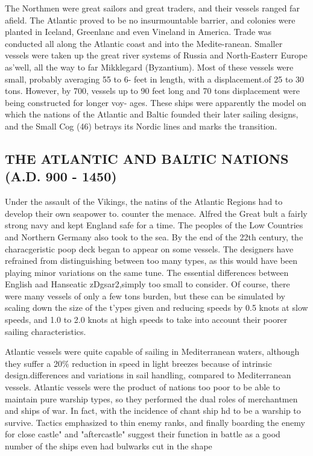 \documentclass{article}
\begin{document}
\begin{multicols}{2}
The Northmen were great sailors and great traders, and their vessels
ranged far afield.  The Atlantic proved to be no insurmountable
barrier, and colonies were planted in Iceland, Greenlanc and even
Vineland in America. Trade was conducted all along the Atlantic coast
and into the Medite-ranean. Smaller vessels were taken up the great
river systems of Russia and North-Easterr Europe as'well, all the way
to far Mikklegard (Byzantium).  Most of these vessels were small,
probably averaging 55 to 6- feet in length, with a displacement.of 25
to 30 tons.  However, by 700, vessels up to 90 feet long and 70 tons
displacement were being constructed for longer voy- ages. These ships
were apparently the model on which the nations of the Atlantic and
Baltic founded their later sailing designs, and the Small Cog (46)
betrays its Nordic lines and marks the transition.


\subsection{THE ATLANTIC AND BALTIC NATIONS (A.D. 900 - 1450)}

Under the assault of the Vikings, the natins of the Atlantic Regions
had to develop their own seapower to. counter the menace. Alfred the
Great bult a fairly strong navy and kept England safe for a time. The
peoples of the Low Countries and Northern Germany also took to the
sea.  By the end of the 22th century, the characgeristic poop deck
began to appear on some vessels.  The designers have refrained from
distinguishing between too many types, as this would have been playing
minor variations on the same tune.  The essential differences between
English aad Hanseatic zDgsar2,simply too small to consider.  Of
course, there were many vessels of only a few tons burden, but these
can be simulated by scaling down the size of the t'ypes given and
reducing speeds by 0.5 knots at slow speeds, and 1.0 to 2.0 knots at
high speeds to take into account their poorer sailing characteristics.

Atlantic vessels were quite capable of sailing in Mediterranean
waters, although they suffer a 20\% reduction in speed in light
breezes because of intrinsic design.differences and variations in sail
handling, compared to Mediterranean vessels.  Atlantic vessels were
the product of nations too poor to be able to maintain pure warship
types, so they performed the dual roles of merchantmen and ships of
war. In fact, with the incidence of chant ship hd to be a warship to
survive.  Tactics emphasized to thin enemy ranks, and finally boarding
the enemy for close castle" and "aftercastle" suggest their function
in battle as a good number of the ships even had bulwarks cut in the
shape


\end{multicols}
\end{document}
